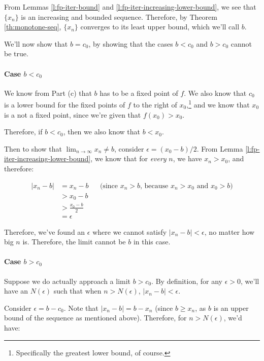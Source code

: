 From Lemmas \ref{l:fp-iter-bound} and \ref{l:fp-iter-increasing-lower-bound}, we see that $\{x_n\}$ is an increasing and bounded sequence. Therefore, by Theorem \ref{th:monotone-seq}, $\{x_n\}$ converges to its least upper bound, which we'll call $b$. 

We'll now show that $b = c_0$, by showing that the cases $b < c_0$ and $b > c_0$ cannot be true.

\paragraph{Case $b < c_0$}

We know from Part (c) that $b$ has to be a fixed point of $f$. We also know that $c_0$ is a lower bound for the fixed points of $f$ to the right of $x_0$,\footnote{Specifically the greatest lower bound, of course.} and we know that $x_0$ is a not a fixed point, since we're given that $f(x_0) > x_0$.

Therefore, if $b < c_0$, then we also know that $b < x_0$. 

Then to show that $\lim_{n \rightarrow \infty} x_n \neq b$, consider $\epsilon = (x_0 - b)/2$. From Lemma \ref{l:fp-iter-increasing-lower-bound}, we know that for \emph{every} $n$, we have $x_n > x_0$, and therefore:

\begin{align*}
|x_n - b| &= x_n - b && \text{(since $x_n > b$, because $x_n > x_0$ and $x_0 > b$)} \\
&> x_0 - b \\
&> \frac{x_0 - b}{2} \\
&= \epsilon
\end{align*}

Therefore, we've found an $\epsilon$ where we cannot satisfy $|x_n - b| < \epsilon$, no matter how big $n$ is. Therefore, the limit cannot be $b$ in this case. 


\paragraph{Case $b > c_0$}

Suppose we do actually approach a limit $b > c_0$. By definition, for any $\epsilon > 0$, we'll have an $N(\epsilon)$ such that when $n > N(\epsilon)$, $|x_n - b| < \epsilon$. 

Consider $\epsilon = b - c_0$. Note that $|x_n - b| = b - x_n$ (since $b \geq x_n$, as $b$ is an upper bound of the sequence as mentioned above). Therefore, for $n > N(\epsilon)$, we'd have:


